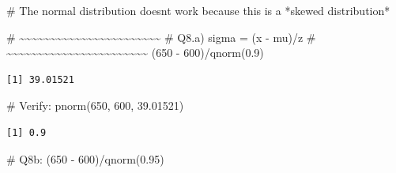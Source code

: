 \documentclass[
  letterpaper,
  DIV=11,
  numbers=noendperiod]{scrreprt}
\newenvironment{Shaded}{\begin{snugshade}}{\end{snugshade}}
\newcommand{\CommentTok}[1]{\textcolor[rgb]{0.37,0.37,0.37}{#1}}
\newcommand{\DecValTok}[1]{\textcolor[rgb]{0.68,0.00,0.00}{#1}}
\newcommand{\FloatTok}[1]{\textcolor[rgb]{0.68,0.00,0.00}{#1}}
\newcommand{\FunctionTok}[1]{\textcolor[rgb]{0.28,0.35,0.67}{#1}}
\newcommand{\NormalTok}[1]{\textcolor[rgb]{0.00,0.23,0.31}{#1}}
\newcommand{\SpecialCharTok}[1]{\textcolor[rgb]{0.37,0.37,0.37}{#1}}
\begin{document}
\begin{Shaded}
\begin{Highlighting}[]
\CommentTok{\# The normal distribution doesn\textquotesingle{}t work because this is a *skewed distribution*}

\CommentTok{\# \textasciitilde{}\textasciitilde{}\textasciitilde{}\textasciitilde{}\textasciitilde{}\textasciitilde{}\textasciitilde{}\textasciitilde{}\textasciitilde{}\textasciitilde{}\textasciitilde{}\textasciitilde{}\textasciitilde{}\textasciitilde{}\textasciitilde{}\textasciitilde{}\textasciitilde{}\textasciitilde{}\textasciitilde{}\textasciitilde{}\textasciitilde{}\textasciitilde{}\textasciitilde{}}
\CommentTok{\# Q8.a) sigma = (x {-} mu)/z}
\CommentTok{\# \textasciitilde{}\textasciitilde{}\textasciitilde{}\textasciitilde{}\textasciitilde{}\textasciitilde{}\textasciitilde{}\textasciitilde{}\textasciitilde{}\textasciitilde{}\textasciitilde{}\textasciitilde{}\textasciitilde{}\textasciitilde{}\textasciitilde{}\textasciitilde{}\textasciitilde{}\textasciitilde{}\textasciitilde{}\textasciitilde{}\textasciitilde{}\textasciitilde{}\textasciitilde{}}
\NormalTok{(}\DecValTok{650} \SpecialCharTok{{-}} \DecValTok{600}\NormalTok{)}\SpecialCharTok{/}\FunctionTok{qnorm}\NormalTok{(}\FloatTok{0.9}\NormalTok{)}
\end{Highlighting}
\end{Shaded}

\begin{verbatim}
[1] 39.01521
\end{verbatim}

\begin{Shaded}
\begin{Highlighting}[]
\CommentTok{\# Verify:}
\FunctionTok{pnorm}\NormalTok{(}\DecValTok{650}\NormalTok{, }\DecValTok{600}\NormalTok{, }\FloatTok{39.01521}\NormalTok{)}
\end{Highlighting}
\end{Shaded}

\begin{verbatim}
[1] 0.9
\end{verbatim}

\begin{Shaded}
\begin{Highlighting}[]
\CommentTok{\# Q8b:}
\NormalTok{(}\DecValTok{650} \SpecialCharTok{{-}} \DecValTok{600}\NormalTok{)}\SpecialCharTok{/}\FunctionTok{qnorm}\NormalTok{(}\FloatTok{0.95}\NormalTok{)}
\end{Highlighting}
\end{Shaded}
\end{document}
